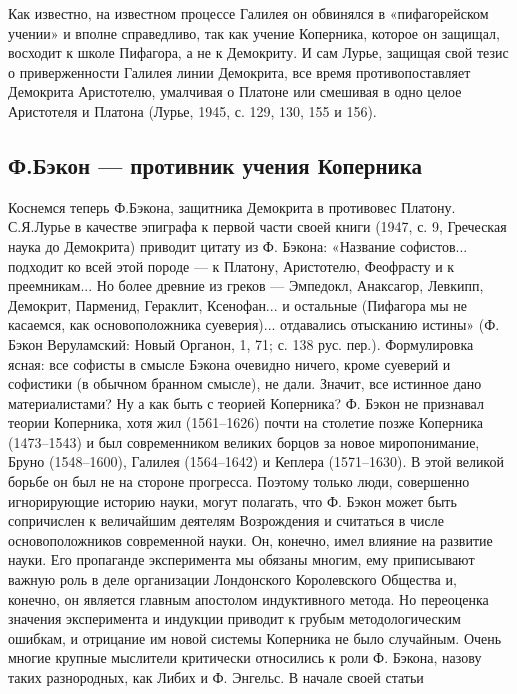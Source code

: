 Как   известно,  на   известном  процессе   Галилея  он   обвинялся  в
«пифагорейском учении» и вполне справедливо, так как учение Коперника,
которое он защищал, восходит к школе Пифагора, а не к Демокриту. И сам
Лурье, защищая  свой тезис  о приверженности Галилея  линии Демокрита,
все время противопоставляет Демокрита  Аристотелю, умалчивая о Платоне
или смешивая в  одно целое Аристотеля и Платона (Лурье,  1945, с. 129,
130, 155 и 156).

\subsection{Ф.Бэкон --- противник учения Коперника}

Коснемся теперь  Ф.Бэкона, защитника  Демокрита в  противовес Платону.
С.Я.Лурье в  качестве эпиграфа  к первой части  своей книги  (1947, с.
9,  Греческая  наука  до  Демокрита) приводит  цитату  из  Ф.  Бэкона:
«Название  софистов... подходит  ко всей  этой породе  --- к  Платону,
Аристотелю, Феофрасту  и к  преемникам... Но  более древние  из греков
---  Эмпедокл,  Анаксагор,   Левкипп,  Демокрит,  Парменид,  Гераклит,
Ксенофан... и остальные (Пифагора  мы не касаемся, как основоположника
суеверия)...  отдавались  отысканию  истины»  (Ф.  Бэкон  Веруламский:
Новый  Органон, 1,  71; с.  138  рус. пер.).  Формулировка ясная:  все
софисты в  смысле Бэкона очевидно  ничего, кроме суеверий  и софистики
(в  обычном  бранном  смысле),  не дали.  Значит,  все  истинное  дано
материалистами?  Ну  а как  быть  с  теорией  Коперника? Ф.  Бэкон  не
признавал теории  Коперника, хотя  жил (1561--1626) почти  на столетие
позже  Коперника  (1473--1543)  и  был  современником  великих  борцов
за  новое миропонимание,  Бруно (1548--1600),  Галилея (1564--1642)  и
Кеплера  (1571--1630). В  этой великой  борьбе  он был  не на  стороне
прогресса. Поэтому только люди, совершенно игнорирующие историю науки,
могут  полагать, что  Ф.  Бэкон может  быть  сопричислен к  величайшим
деятелям Возрождения и считаться  в числе основоположников современной
науки. Он,  конечно, имел  влияние на  развитие науки.  Его пропаганде
эксперимента  мы  обязаны  многим,   ему  приписывают  важную  роль  в
деле  организации Лондонского  Королевского  Общества  и, конечно,  он
является главным апостолом индуктивного метода. Но переоценка значения
эксперимента и индукции приводит  к грубым методологическим ошибкам, и
отрицание им новой  системы Коперника не было  случайным. Очень многие
крупные  мыслители  критически относились  к  роли  Ф. Бэкона,  назову
таких  разнородных, как  Либих и  Ф.  Энгельс. В  начале своей  статьи
